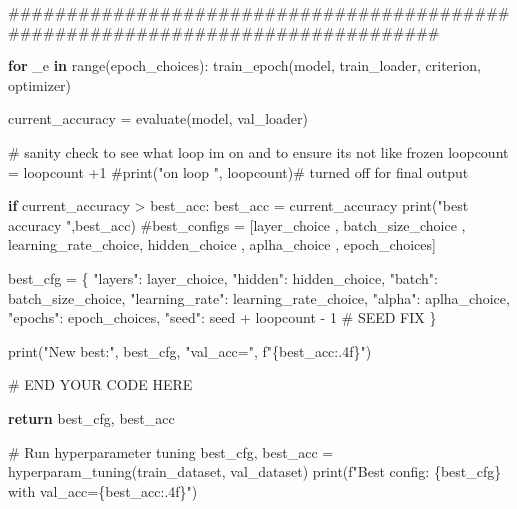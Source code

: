 \documentclass[
  letterpaper,
  DIV=11,
  numbers=noendperiod]{scrartcl}
\newenvironment{Shaded}{\begin{snugshade}}{\end{snugshade}}
\newcommand{\BuiltInTok}[1]{\textcolor[rgb]{0.00,0.23,0.31}{#1}}
\newcommand{\CommentTok}[1]{\textcolor[rgb]{0.37,0.37,0.37}{#1}}
\newcommand{\ControlFlowTok}[1]{\textcolor[rgb]{0.00,0.23,0.31}{\textbf{#1}}}
\newcommand{\DecValTok}[1]{\textcolor[rgb]{0.68,0.00,0.00}{#1}}
\newcommand{\KeywordTok}[1]{\textcolor[rgb]{0.00,0.23,0.31}{\textbf{#1}}}
\newcommand{\NormalTok}[1]{\textcolor[rgb]{0.00,0.23,0.31}{#1}}
\newcommand{\OperatorTok}[1]{\textcolor[rgb]{0.37,0.37,0.37}{#1}}
\newcommand{\RegionMarkerTok}[1]{\textcolor[rgb]{0.00,0.23,0.31}{#1}}
\newcommand{\SpecialCharTok}[1]{\textcolor[rgb]{0.37,0.37,0.37}{#1}}
\newcommand{\SpecialStringTok}[1]{\textcolor[rgb]{0.13,0.47,0.30}{#1}}
\newcommand{\StringTok}[1]{\textcolor[rgb]{0.13,0.47,0.30}{#1}}
\begin{document}
\begin{Shaded}
\begin{Highlighting}[]
        \CommentTok{\#\#\#\#\#\#\#\#\#\#\#\#\#\#\#\#\#\#\#\#\#\#\#\#\#\#\#\#\#\#\#\#\#\#\#\#\#\#\#\#\#\#\#\#\#\#\#\#\#\#\#\#\#\#\#\#\#\#\#\#\#\#\#\#\#\#\#\#\#\#\#\#\#\#\#\#\#\#\#\#}

        \ControlFlowTok{for}\NormalTok{ \_e }\KeywordTok{in} \BuiltInTok{range}\NormalTok{(epoch\_choices):}
\NormalTok{            train\_epoch(model, train\_loader, criterion, optimizer)}

\NormalTok{        current\_accuracy }\OperatorTok{=}\NormalTok{ evaluate(model, val\_loader)}

        \CommentTok{\# sanity check to see what loop im on and to ensure its not like frozen}
\NormalTok{        loopcount }\OperatorTok{=}\NormalTok{ loopcount }\OperatorTok{+}\DecValTok{1}
        \CommentTok{\#print("on loop ", loopcount)\# turned off for final output}

        \ControlFlowTok{if}\NormalTok{ current\_accuracy }\OperatorTok{\textgreater{}}\NormalTok{ best\_acc:}
\NormalTok{            best\_acc }\OperatorTok{=}\NormalTok{ current\_accuracy}
            \BuiltInTok{print}\NormalTok{(}\StringTok{"best accuracy "}\NormalTok{,best\_acc)}
            \CommentTok{\#best\_configs = [layer\_choice , batch\_size\_choice , learning\_rate\_choice, hidden\_choice , aplha\_choice , epoch\_choices]}

\NormalTok{            best\_cfg }\OperatorTok{=}\NormalTok{ \{}
                    \StringTok{"layers"}\NormalTok{: layer\_choice,}
                    \StringTok{"hidden"}\NormalTok{: hidden\_choice,}
                    \StringTok{"batch"}\NormalTok{: batch\_size\_choice,}
                    \StringTok{"learning\_rate"}\NormalTok{: learning\_rate\_choice,}
                    \StringTok{"alpha"}\NormalTok{: aplha\_choice,}
                    \StringTok{"epochs"}\NormalTok{: epoch\_choices,}
                    \StringTok{"seed"}\NormalTok{: seed }\OperatorTok{+}\NormalTok{ loopcount }\OperatorTok{{-}} \DecValTok{1}  \CommentTok{\# SEED FIX}
\NormalTok{                \}}

            \BuiltInTok{print}\NormalTok{(}\StringTok{"New best:"}\NormalTok{, best\_cfg, }\StringTok{"val\_acc="}\NormalTok{, }\SpecialStringTok{f"}\SpecialCharTok{\{}\NormalTok{best\_acc}\SpecialCharTok{:.4f\}}\SpecialStringTok{"}\NormalTok{)}



    \CommentTok{\# }\RegionMarkerTok{END}\CommentTok{ YOUR CODE HERE}

    \ControlFlowTok{return}\NormalTok{ best\_cfg, best\_acc}


\CommentTok{\# Run hyperparameter tuning}
\NormalTok{best\_cfg, best\_acc }\OperatorTok{=}\NormalTok{ hyperparam\_tuning(train\_dataset, val\_dataset)}
\BuiltInTok{print}\NormalTok{(}\SpecialStringTok{f"Best config: }\SpecialCharTok{\{}\NormalTok{best\_cfg}\SpecialCharTok{\}}\SpecialStringTok{ with val\_acc=}\SpecialCharTok{\{}\NormalTok{best\_acc}\SpecialCharTok{:.4f\}}\SpecialStringTok{"}\NormalTok{)}

\end{Highlighting}
\end{Shaded}
\end{document}

